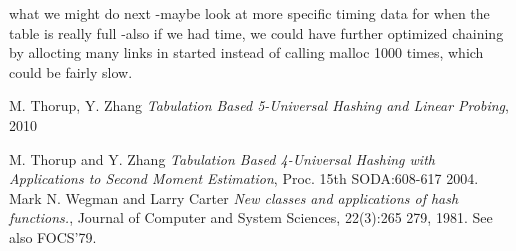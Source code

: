 \documentclass[11pt]{article}
\begin{document}
what we might do next
-maybe look at more specific timing data for when the table is really full
-also if we had time, we could have further optimized chaining by allocting many links in started 
instead of calling malloc 1000 times, which could be fairly slow.



\begin{thebibliography}{77}

M. Thorup, Y. Zhang
\emph{Tabulation Based 5-Universal Hashing and Linear Probing},
2010

M. Thorup and Y. Zhang 
\emph{Tabulation Based 4-Universal Hashing with Applications to Second Moment Estimation},
Proc. 15th SODA:608-617 2004.
Mark N. Wegman and Larry Carter
\emph{New classes and applications of hash functions.},
Journal of Computer and System Sciences, 22(3):265 279, 1981. See also FOCS'79.
\end{thebibliography}


\end{document}
